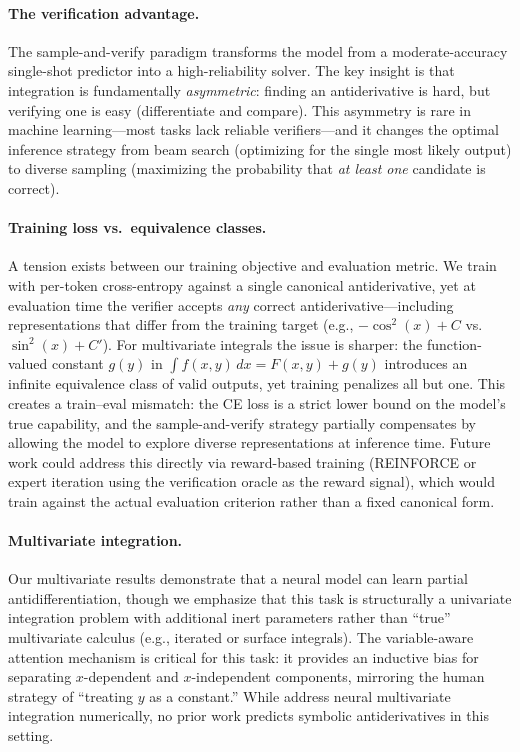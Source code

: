 \documentclass{article}
\begin{document}
\paragraph{The verification advantage.}
The sample-and-verify paradigm transforms the model from a
moderate-accuracy single-shot predictor into a high-reliability solver.
The key insight is that integration is fundamentally \emph{asymmetric}:
finding an antiderivative is hard, but verifying one is easy (differentiate
and compare). This asymmetry is rare in machine learning---most tasks lack
reliable verifiers---and it changes the optimal inference strategy from
beam search (optimizing for the single most likely output) to diverse
sampling (maximizing the probability that \emph{at least one} candidate is
correct).

\paragraph{Training loss vs.\ equivalence classes.}
A tension exists between our training objective and evaluation metric. We
train with per-token cross-entropy against a single canonical
antiderivative, yet at evaluation time the verifier accepts \emph{any}
correct antiderivative---including representations that differ from the
training target (e.g., $-\cos^2(x) + C$ vs.\ $\sin^2(x) + C'$). For
multivariate integrals the issue is sharper: the function-valued constant
$g(y)$ in $\int f(x,y)\,dx = F(x,y) + g(y)$ introduces an infinite
equivalence class of valid outputs, yet training penalizes all but one.
This creates a train--eval mismatch: the CE loss is a strict lower bound
on the model's true capability, and the sample-and-verify strategy
partially compensates by allowing the model to explore diverse
representations at inference time. Future work could address this directly
via reward-based training (REINFORCE or expert iteration using the
verification oracle as the reward signal), which would train against the
actual evaluation criterion rather than a fixed canonical form.

\paragraph{Multivariate integration.}
Our multivariate results demonstrate that a neural model can learn partial
antidifferentiation, though we emphasize that this task is structurally
a univariate integration problem with additional inert parameters rather
than ``true'' multivariate calculus (e.g., iterated or surface integrals).
The variable-aware attention mechanism is critical for this task: it
provides an inductive bias for separating $x$-dependent and
$x$-independent components, mirroring the human strategy of ``treating
$y$ as a constant.'' While \citet{rubab2025neural} address neural
multivariate integration numerically, no prior work predicts symbolic
antiderivatives in this setting.
\end{document}
